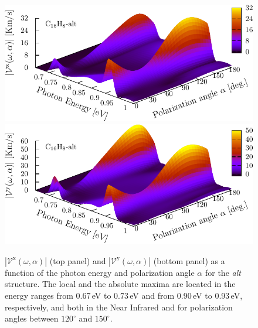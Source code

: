 \documentclass[prb,11pt,tightenlines,twocolumn,aps]{revtex4-1}
\begin{document}
\begin{figure}[tb]
    \centering
    \includegraphics[width=\linewidth]{altplots/alt-3d-vxb}
    \\
    \includegraphics[width=\linewidth]{altplots/alt-3d-vyb}
    
    \caption{$|\mathcal{V}^{\mathrm{x}}(\omega,\alpha)|$ (top panel) and
    $|\mathcal{V}^{\mathrm{y}}(\omega,\alpha)|$ (bottom panel)  as a function
    of the photon energy and polarization angle $\alpha$ for the \emph{alt}
    structure. The local and the absolute maxima are located in the energy
    ranges from 0.67\,eV to 0.73\,eV and from 0.90\,eV to 0.93\,eV,
    respectively, and both in the Near Infrared and for polarization angles
    between $120^{\circ}$ and $150^{\circ}$.}
    \label{fig:alt-3d-vva}
\end{figure}
\end{document}
